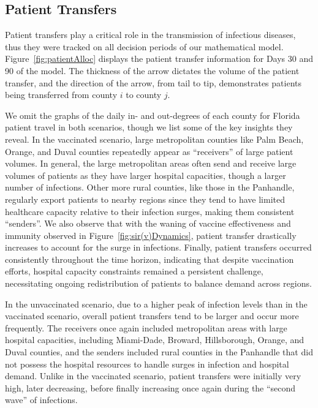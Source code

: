 \documentclass{article}
\begin{document}

\subsection{Patient Transfers}
Patient transfers play a critical role in the transmission of infectious diseases, thus they were tracked on all decision periods of our mathematical model. Figure~\ref{fig:patientAlloc} displays the patient transfer information for Days 30 and 90 of the model. The thickness of the arrow dictates the volume of the patient transfer, and the direction of the arrow, from tail to tip, demonstrates patients being transferred from county $i$ to county $j$.  

We omit the graphs of the daily in- and out-degrees of each county for Florida patient travel in both scenarios, though we list some of the key insights they reveal. In the vaccinated scenario, large metropolitan counties like Palm Beach, Orange, and Duval counties repeatedly appear as ``receivers'' of large patient volumes. In general, the large metropolitan areas often send and receive large volumes of patients as they have larger hospital capacities, though a larger number of infections. Other more rural counties, like those in the Panhandle, regularly export patients to nearby regions since they tend to have limited healthcare capacity relative to their infection surges, making them consistent ``senders''. We also observe that with the waning of vaccine effectiveness and immunity observed in Figure~\ref{fig:sir(v)Dynamics}, patient transfer drastically increases to account for the surge in infections. Finally, patient transfers occurred consistently throughout the time horizon, indicating that despite vaccination efforts, hospital capacity constraints remained a persistent challenge, necessitating ongoing redistribution of patients to balance demand across regions. 

In the unvaccinated scenario, due to a higher peak of infection levels than in the vaccinated scenario, overall patient transfers tend to be larger and occur more frequently. The receivers once again included metropolitan areas with large hospital capacities, including Miami-Dade, Broward, Hillsborough, Orange, and Duval counties, and the senders included rural counties in the Panhandle that did not possess the hospital resources to handle surges in infection and hospital demand. Unlike in the vaccinated scenario, patient transfers were initially very high, later decreasing, before finally increasing once again during the ``second wave'' of infections. 
\end{document}
